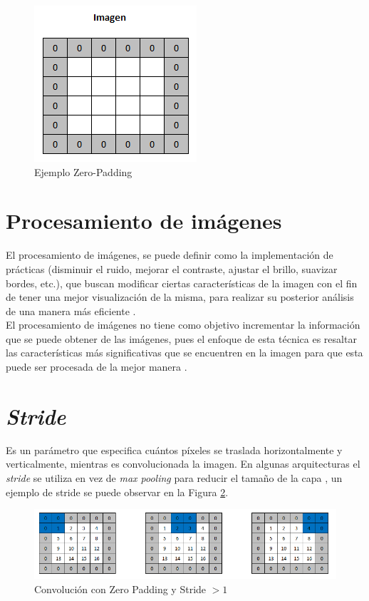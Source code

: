 \begin{figure}[ht]
	\centering
	\includegraphics[scale=0.65]{Figs/padding.png}
	\caption{Ejemplo Zero-Padding}
	\label{padding}
\end{figure}


\newpage
\section{Procesamiento de imágenes} El procesamiento de imágenes, se puede definir como la implementación de prácticas (disminuir el ruido, mejorar el contraste, ajustar el brillo, suavizar bordes, etc.), que buscan modificar ciertas características de la imagen con el fin de tener una mejor visualización de la misma, para realizar su posterior análisis de una manera más eficiente \cite{ref_13}.\\
El procesamiento de imágenes no tiene como objetivo incrementar la información que se puede obtener de las imágenes, pues el enfoque de esta técnica es resaltar las características más significativas que se encuentren en la imagen para que esta puede ser procesada de la mejor manera \cite{ref_13}.


\section{\textit{Stride}}

Es un parámetro que especifica cuántos píxeles se traslada horizontalmente y verticalmente, mientras es convolucionada la imagen. En algunas arquitecturas el \textit{stride} se utiliza en vez de \textit{max pooling} para reducir el tamaño de la capa \cite{murphy2016overview}, un ejemplo de stride se puede observar en la Figura \ref{stride}.

\begin{figure}[ht]
	\centering
	\includegraphics[scale=0.5]{Figs/stride.png}
	\caption{Convolución con Zero Padding y Stride $> 1$}
	\label{stride}
\end{figure}

